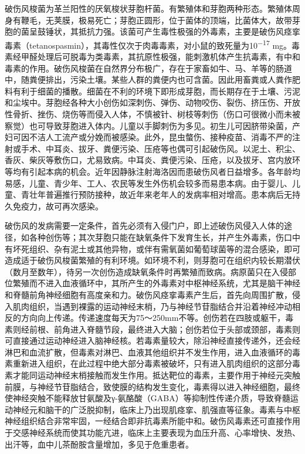破伤风梭菌为革兰阳性的厌氧梭状芽胞杆菌。有繁殖体和芽胞两种形态。繁殖体周身有鞭毛，无荚膜，极易死亡；芽胞正圆形，位于菌体的顶端，比菌体大，故带芽胞的菌呈鼓锤状，其抵抗力强。该菌可产生毒性极强的外毒素，主要是破伤风痉挛毒素（tetanospasmin），其毒性仅次于肉毒毒素，对小鼠的致死量为10\textsuperscript{−17}
mg。毒素经甲醛处理后可脱毒为类毒素，其抗原性极强，能刺激机体产生抗毒素，有中和毒素的作用。破伤风梭菌在自然界分布极广，存在于家畜如牛、马、羊等的肠道中，随粪便排出，污染土壤。某些人群的粪便内也可含菌。因此用畜粪或人粪作肥料有利于细菌的播散。细菌在不利的环境下即形成芽胞，而长期存在于土壤、污泥和尘埃中。芽胞经各种大小创伤如深刺伤、弹伤、动物咬伤、裂伤、挤压伤、开放性骨折、挫伤、烧伤等而侵入人体，不慎被针、树枝等刺伤（伤口可很微小而未被察觉）也可导致芽胞进入体内。儿童以手脚刺伤为多见。初生儿可因脐带染菌，产妇可因不洁人工流产或分娩而被感染。此外，昆虫螫伤、接种疫苗、消毒不严的注射或手术、中耳炎、拔牙、粪便污染、压疮等也偶可引起破伤风。以泥土、积尘、香灰、柴灰等敷伤口，尤易致病。中耳炎、粪便污染、压疮，以及拔牙、宫内放环等均有引起本病的机会。近年因静脉注射海洛因而患破伤风者日益增多。各年龄均易感，儿童、青少年、工人、农民等发生外伤机会较多而易患本病。由于婴儿、儿童、青壮年普遍推行预防接种，故近年来老年人的发病率相对增高。患本病后无持久免疫力，故可再次感染。

破伤风的发病需要一定条件，首先必须有入侵门户，即上述破伤风侵入人体的途径，如各种创伤等；其次芽胞只能在缺氧条件下发育生长，并产生外毒素，伤口中有坏死组织、杂有泥土或其他异物，或伴有需氧菌如葡萄球菌等的混合感染，即可造成适于破伤风梭菌繁殖的有利环境。如环境不利，则芽胞可在组织内较长期潜伏（数月至数年），待另一次创伤造成缺氧条件时再繁殖而致病。病原菌只在入侵部位繁殖而不进入血液循环中，其所产生的外毒素对中枢神经系统，尤其是脑干神经和脊髓前角神经细胞有高度亲和力。破伤风痉挛毒素产生后，首先向周围扩散，侵入肌肉组织，当遇到裸露的运动神经末梢，乃与神经节苷脂结合并沿着神经冲动相反的方向向上传递。传递速度每天为75～250mm不等。创伤若在四肢或躯干，毒素则经前根、前角进入脊髓节段，最终进入大脑；创伤若位于头部或颈部，毒素则可直接通过运动神经进入脑神经核。若毒素量较大，除沿神经直接传递外，还会经淋巴和血流扩散，但毒素对淋巴、血液其他组织并不发生作用，进入血液循环的毒素重新进入组织，在此过程中绝大部分毒素被破坏，只有进入肌肉组织的这部分毒素才能同运动神经末梢接触而发生作用。抵达靶位的毒素，主要作用于神经元突触前膜，与神经节苷脂结合，致使膜的结构发生变化，毒素得以进入神经细胞，最终使神经突触不能释放甘氨酸及γ-氨酪酸（GABA）等抑制性传递介质，导致脊髓运动神经元和脑干的广泛脱抑制，临床上乃出现肌痉挛、肌强直等征象。毒素与中枢神经组织结合非常牢固，一经结合即非抗毒素所能中和。破伤风毒素还可直接作用于交感神经系统而使其功能亢进，临床上主要表现为血压升高、心率增快、发热、出汗等，血中儿茶酚胺含量增加，多见于危重患者。

